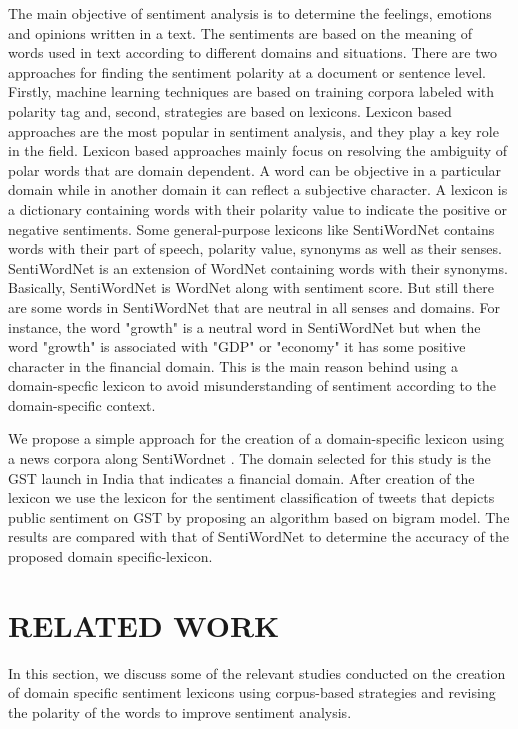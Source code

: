 \documentclass[a4paper, 10pt, conference]{ieeeconf}
\begin{document}
	The main objective of sentiment analysis is to determine  the feelings, emotions and opinions written in a
	text. The sentiments are based on the meaning of words used in text according to different domains and situations. There are two approaches for finding the sentiment polarity at a document	or sentence level. Firstly, machine learning techniques are based on training corpora labeled with polarity tag and, second, strategies are based on lexicons. Lexicon based approaches are the most popular in sentiment analysis, and they play a key role in the field. Lexicon based approaches mainly focus on resolving the ambiguity of polar words that are domain dependent. A word can be objective in a particular domain while in another domain it can reflect a subjective character. A lexicon is a dictionary containing 	words with their polarity value to indicate the positive or	negative sentiments. Some general-purpose lexicons like SentiWordNet \cite{c1} contains words with their part of speech, polarity value, synonyms as well as their senses. SentiWordNet is an extension of WordNet containing words with their synonyms. Basically, SentiWordNet is WordNet along with sentiment score. But still there are some words in SentiWordNet that are neutral in all senses and domains. For instance, the word "growth" is a neutral word in SentiWordNet but when the word "growth" is associated with "GDP" or "economy" it has some positive character in the financial domain. This is the main reason behind using a domain-specfic lexicon to avoid misunderstanding of sentiment according to the domain-specific context.
	
	We propose a simple approach for the creation of a domain-specific lexicon using a news corpora along SentiWordnet \cite{c1}. The domain selected for this study is the GST launch in India that indicates a financial domain. After creation of the lexicon we use the lexicon for the sentiment classification of tweets that depicts public sentiment on GST by proposing an algorithm based on bigram model. The results are compared with that of SentiWordNet to determine the accuracy of the proposed domain specific-lexicon.
	
	
	
	\section{RELATED WORK}
	
	In this section, we discuss some of the relevant studies conducted on the creation of domain specific sentiment lexicons using corpus-based strategies and revising the polarity of the words to improve sentiment analysis.
	
\end{document}

